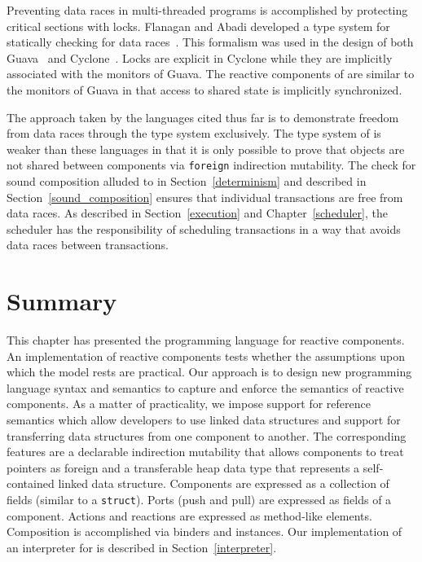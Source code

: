 Preventing data races in multi-threaded programs is accomplished by protecting critical sections with locks.
Flanagan and Abadi developed a type system for statically checking for data races~\cite{Flanagan:1999:OTA:646734.701453, Abadi:2006:TSL:1119479.1119480}.
This formalism was used in the design of both Guava~\cite{Bacon:2000:GDJ:353171.353197} and Cyclone~\cite{Grossman:2003:TMC:604174.604177}.
Locks are explicit in Cyclone while they are implicitly associated with the monitors of Guava.
The reactive components of \rcgo{} are similar to the monitors of Guava in that access to shared state is implicitly synchronized.

The approach taken by the languages cited thus far is to demonstrate freedom from data races through the type system exclusively.
The type system of \rcgo{} is weaker than these languages in that it is only possible to prove that objects are not shared between components via \verb+foreign+ indirection mutability.
The check for sound composition alluded to in Section~\ref{determinism} and described in Section~\ref{sound_composition} ensures that individual transactions are free from data races.
As described in Section~\ref{execution} and Chapter~\ref{scheduler}, the scheduler has the responsibility of scheduling transactions in a way that avoids data races between transactions.

\section{Summary}
This chapter has presented the \rcgo programming language for reactive components.
An implementation of reactive components tests whether the assumptions upon which the model rests are practical.
Our approach is to design new programming language syntax and semantics to capture and enforce the semantics of reactive components.
As a matter of practicality, we impose support for reference semantics which allow developers to use linked data structures and support for transferring data structures from one component to another.
The corresponding features are a declarable indirection mutability that allows components to treat pointers as foreign and a transferable heap data type that represents a self-contained linked data structure.
Components are expressed as a collection of fields (similar to a \verb+struct+).
Ports (push and pull) are expressed as fields of a component.
Actions and reactions are expressed as method-like elements.
Composition is accomplished via binders and instances.
Our implementation of an interpreter for \rcgo is described in Section~\ref{interpreter}.

